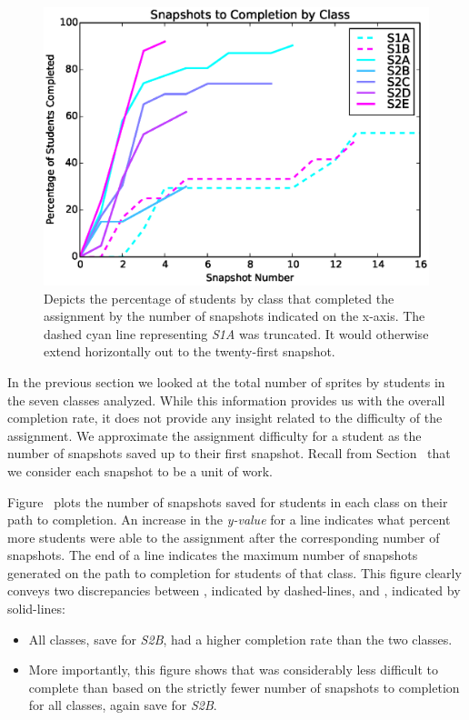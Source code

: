 \begin{figure}[!t]
\centering \includegraphics[width=5.25in]{graphs/snapshots_to_completion.eps}
\caption{Depicts the percentage of students by class that completed the
  assignment by the number of snapshots indicated on the x-axis. The dashed
  cyan line representing \emph{S1A} was truncated. It would otherwise extend
  horizontally out to the twenty-first snapshot.}
\end{figure}

In the previous section we looked at the total number of sprites \caught{} by
students in the seven classes analyzed. While this information provides us with
the overall completion rate, it does not provide any insight related to the
difficulty of the assignment. We approximate the assignment difficulty for a
student as the number of snapshots saved up to their first \com{}
snapshot. Recall from Section~ that we consider each
snapshot to be a unit of work.

Figure~ plots the number of snapshots
saved for students in each class on their path to completion. An increase in
the \emph{y-value} for a line indicates what percent more students were able to
\com{} the assignment after the corresponding number of snapshots. The end of a
line indicates the maximum number of snapshots generated on the path to
completion for students of that class. This figure clearly conveys two
discrepancies between \sone{}, indicated by dashed-lines, and \stwo{},
indicated by solid-lines:

\begin{itemize}
\item All \stwo{} classes, save for \emph{S2B}, had a higher completion rate
  than the two \sone{} classes.
\item More importantly, this figure shows that \stwo{} was considerably less
  difficult to complete than \sone{} based on the strictly fewer number of
  snapshots to completion for all \stwo{} classes, again save for \emph{S2B}.
\end{itemize}

